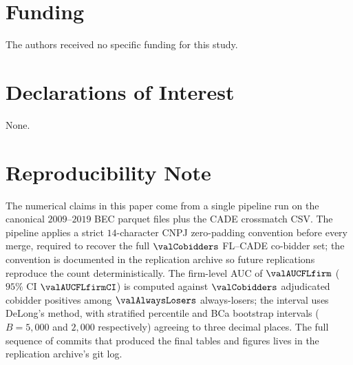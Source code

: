 \section*{Funding}

The authors received no specific funding for this study.

\section*{Declarations of Interest}

None.

\section*{Reproducibility Note}

The numerical claims in this paper come from a single pipeline
run on the canonical $2009$--$2019$ BEC parquet files plus the
CADE crossmatch CSV. The pipeline applies a strict
$14$-character CNPJ zero-padding convention before every merge,
required to recover the full $\valCobidders$ FL--CADE co-bidder
set; the convention is documented in the replication archive so
future replications reproduce the count deterministically. The
firm-level AUC of $\valAUCFLfirm$ ($95\%$ CI $\valAUCFLfirmCI$)
is computed against $\valCobidders$ adjudicated cobidder
positives among $\valAlwaysLosers$ always-losers; the interval
uses DeLong's method, with stratified percentile and BCa
bootstrap intervals ($B = 5{,}000$ and $2{,}000$ respectively)
agreeing to three decimal places. The full sequence of commits
that produced the final tables and figures lives in the
replication archive's git log.

